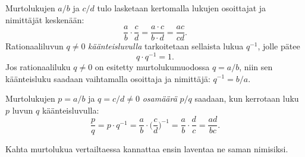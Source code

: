     Murtolukujen $a/b$ ja $c/d$ tulo lasketaan kertomalla lukujen osoittajat ja nimittäjät keskenään:
    \[
    \frac{a}{b}\cdot \frac{c}{d} = \frac{a\cdot c}{b\cdot d} = \frac{ac}{cd}.
    \]
    Rationaaliluvun $q\neq 0$ \emph{käänteisluvulla} tarkoitetaan sellaista lukua $q^{-1}$, jolle pätee
    \[
    q\cdot q^{-1} = 1.
    \]
    Jos rationaaliluku $q\neq 0$ on esitetty murtolukumuodossa $q=a/b$, niin sen käänteisluku saadaan vaihtamalla osoittaja ja nimittäjä: $q^{-1} = b/a$.
    
    Murtolukujen $p=a/b$ ja $q=c/d\neq 0$ \emph{osamäärä} $p/q$ saadaan, kun kerrotaan luku $p$ luvun $q$ käänteisluvulla:
    \[
    \frac{p}{q} = p\cdot q^{-1} = \frac{a}{b}\cdot\Big(\frac{c}{d}\Big)^{-1} = \frac{a}{b}\cdot \frac{d}{c}
    = \frac{ad}{bc}.
    \]
    
    
    
    
    Kahta murtolukua vertailtaessa kannattaa ensin laventaa ne saman nimisiksi.
    
